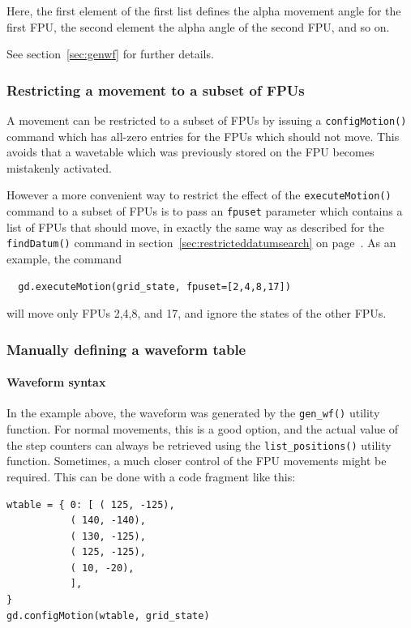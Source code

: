 \documentclass[11pt,a4paper]{scrartcl}
\begin{document}
Here, the first element of the first list
defines the alpha movement angle for the
first FPU, the second element the alpha
angle of the second FPU, and so on.

See section~\ref{sec:genwf} for further details.

\subsubsection{Restricting a movement to a subset of FPUs}
A movement can be restricted to a subset of FPUs by issuing a
\texttt{configMotion()} command which has all-zero entries for the FPUs
which should not move. This avoids that a wavetable which was
previously stored on the FPU becomes mistakenly activated.

However a more convenient way to restrict the effect
of the \texttt{executeMotion()} command to a
subset of FPUs is to pass an \texttt{fpuset} parameter
which contains a list of FPUs that should move,
in exactly the same way as described for the \texttt{findDatum()}
command in section~\ref{sec:restricteddatumsearch}
on page~\pageref{sec:restricteddatumsearch}. As an example,
the command
\begin{verbatim}
  gd.executeMotion(grid_state, fpuset=[2,4,8,17])
\end{verbatim}
will move only FPUs 2,4,8, and 17, and ignore the states of the other
FPUs.


\subsubsection{Manually defining a waveform table}
\label{sec:waveform_rules}
\paragraph{Waveform syntax}

In the example above, the waveform was generated by the
\texttt{gen\_wf()} utility function.  For normal movements, this is a
good option, and the actual value of the step counters can always be
retrieved using the \texttt{list\_positions()} utility
function. Sometimes, a much closer control of the FPU movements might
be required. This can be done with a code fragment like this:

\begin{verbatim}
wtable = { 0: [ ( 125, -125),
           ( 140, -140),
           ( 130, -125),
           ( 125, -125),
           ( 10, -20),
           ],
}
gd.configMotion(wtable, grid_state)
\end{verbatim}
\end{document}
